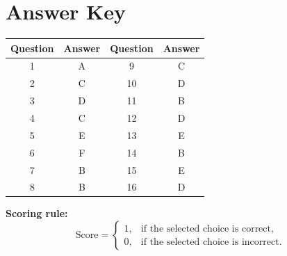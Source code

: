\documentclass[a4paper,12pt]{article}
\theoremstyle{mystyle}
\numberwithin{equation}{section}
\numberwithin{theorem}{section}
\numberwithin{proposition}{section}
\numberwithin{example}{section}
\numberwithin{remark}{section}
\numberwithin{lemma}{section}
\numberwithin{corollary}{section}
\numberwithin{definition}{section}
\begin{document}
\section{Answer Key}

\begin{center}
\begin{tabular}{|c|c||c|c|}
\hline
\textbf{Question} & \textbf{Answer} &
\textbf{Question} & \textbf{Answer}\\
\hline
1 & A & 9 & C\\
2 & C & 10 & D\\
3 & D & 11 & B\\
4 & C & 12 & D\\
5 & E & 13 & E\\
6 & F & 14 & B\\
7 & B & 15 & E\\
8 & B & 16 & D\\
\hline
\end{tabular}
\end{center}


\noindent
\textbf{Scoring rule:}
\[
\text{Score}=
\begin{cases}
1, & \text{if the selected choice is correct},\\
0, & \text{if the selected choice is incorrect}.
\end{cases}
\]

\printbibliography
\end{document}
